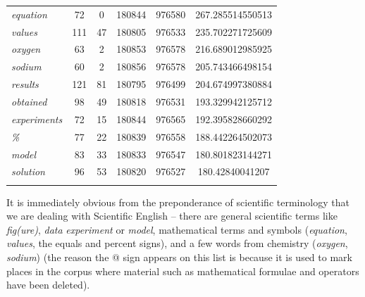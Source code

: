 \begin{table}
{\begin{tabular}[t]{l S[table-format=5] S[table-format=5] S[table-format=6] S[table-format=6] S[table-format=4.2]}
\textit{equation} & 72 & 0 & 180844 & 976580 & 267.285514550513 \\
\textit{values} & 111 & 47 & 180805 & 976533 & 235.702271725609 \\
\textit{oxygen} & 63 & 2 & 180853 & 976578 & 216.689012985925 \\
\textit{sodium} & 60 & 2 & 180856 & 976578 & 205.743466498154 \\
\textit{results} & 121 & 81 & 180795 & 976499 & 204.674997380884 \\
\textit{obtained} & 98 & 49 & 180818 & 976531 & 193.329942125712 \\
\textit{experiments} & 72 & 15 & 180844 & 976565 & 192.395828660292 \\
\textit{\%} & 77 & 22 & 180839 & 976558 & 188.442264502073 \\
\textit{model} & 83 & 33 & 180833 & 976547 & 180.801823144271 \\
\textit{solution} & 96 & 53 & 180820 & 976527 & 180.42840041207 \\
\lspbottomrule
\end{tabular}}
\end{table}

It is immediately obvious from the preponderance of scientific terminology that we are dealing with Scientific English -- there are general scientific terms like \textit{fig(ure)}, \textit{data} \textit{experiment} or \textit{model}, mathematical terms and symbols (\textit{equation}, \textit{values}, the equals and percent signs), and a few words from chemistry (\textit{oxygen}, \textit{sodium}) (the reason the @ sign appears on this list is because it is used to mark places in the corpus where material such as mathematical formulae and operators have been deleted).

